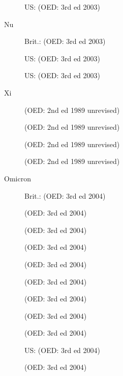 \begin{description}
                US:  (OED: 3rd ed 2003)

    \item[Nu] Brit.:  (OED: 3rd ed 2003)

                US:  (OED: 3rd ed 2003)

                US:  (OED: 3rd ed 2003)

    \item[Xi]  (OED: 2nd ed 1989 unrevised)

                 (OED: 2nd ed 1989 unrevised)

                 (OED: 2nd ed 1989 unrevised)

                 (OED: 2nd ed 1989 unrevised)

    \item[Omicron] Brit.:  (OED: 3rd ed 2004)

                     (OED: 3rd ed 2004)

                     (OED: 3rd ed 2004)

                     (OED: 3rd ed 2004)

                     (OED: 3rd ed 2004)

                     (OED: 3rd ed 2004)

                     (OED: 3rd ed 2004)

                     (OED: 3rd ed 2004)

                     (OED: 3rd ed 2004)

                    US:  (OED: 3rd ed 2004)

                     (OED: 3rd ed 2004)


\end{description}
